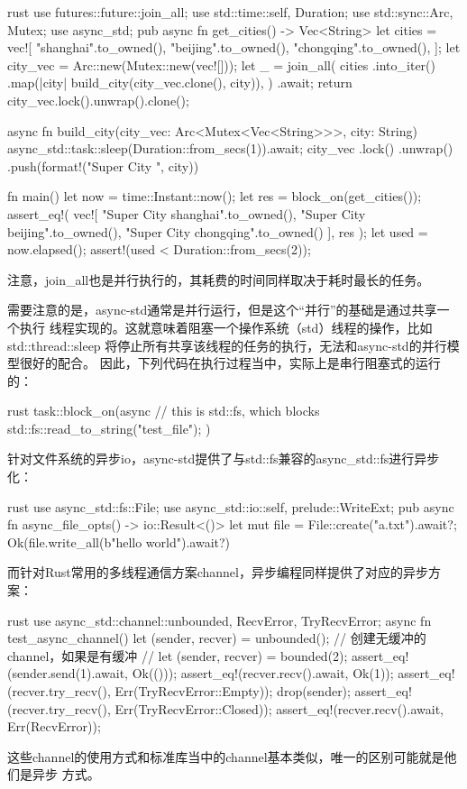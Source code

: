 \begin{code-block}{rust}
use futures::future::join_all;
use std::time::{self, Duration};
use std::sync::{Arc, Mutex};
use async_std;
pub async fn get_cities() -> Vec<String> {
    let cities = vec![
        "shanghai".to_owned(),
        "beijing".to_owned(),
        "chongqing".to_owned(),
    ];
    let city_vec = Arc::new(Mutex::new(vec![]));
    let _ = join_all(
        cities
            .into_iter()
            .map(|city| build_city(city_vec.clone(), city)),
    )
    .await;
    return city_vec.lock().unwrap().clone();
}

async fn build_city(city_vec: Arc<Mutex<Vec<String>>>, city: String) {
    async_std::task::sleep(Duration::from_secs(1)).await;
    city_vec
        .lock()
        .unwrap()
        .push(format!("Super City {}", city))
}

fn main() {
    let now = time::Instant::now();
    let res = block_on(get_cities());
    assert_eq!(
        vec![
            "Super City shanghai".to_owned(),
            "Super City beijing".to_owned(),
            "Super City chongqing".to_owned()
        ],
        res
    );
    let used = now.elapsed();
    assert!(used < Duration::from_secs(2));
}
\end{code-block}
注意，join\_all也是并行执行的，其耗费的时间同样取决于耗时最长的任务。

需要注意的是，async-std通常是并行运行，但是这个“并行”的基础是通过共享一个执行
线程实现的。这就意味着阻塞一个操作系统（std）线程的操作，比如std::thread::sleep
将停止所有共享该线程的任务的执行，无法和async-std的并行模型很好的配合。
因此，下列代码在执行过程当中，实际上是串行阻塞式的运行的：
\begin{code-block}{rust}
task::block_on(async {
    // this is std::fs, which blocks
    std::fs::read_to_string("test_file");
})
\end{code-block}

针对文件系统的异步io，async-std提供了与std::fs兼容的async\_std::fs进行异步化：
\begin{code-block}{rust}
use async_std::fs::File;
use async_std::{io::{self, prelude::WriteExt}};
pub async fn async_file_opts() -> io::Result<()> {
    let mut file = File::create("a.txt").await?;
    Ok(file.write_all(b"hello world").await?)
}
\end{code-block}

而针对Rust常用的多线程通信方案channel，异步编程同样提供了对应的异步方案：
\begin{code-block}{rust}
use async_std::channel::{unbounded, RecvError, TryRecvError};
async fn test_async_channel() {
    let (sender, recver) = unbounded(); // 创建无缓冲的channel，如果是有缓冲
                                        // let (sender, recver) = bounded(2);
    assert_eq!(sender.send(1).await, Ok(()));
    assert_eq!(recver.recv().await, Ok(1));
    assert_eq!(recver.try_recv(), Err(TryRecvError::Empty));
    drop(sender);
    assert_eq!(recver.try_recv(), Err(TryRecvError::Closed));
    assert_eq!(recver.recv().await, Err(RecvError));
}
\end{code-block}
这些channel的使用方式和标准库当中的channel基本类似，唯一的区别可能就是他们是异步
方式。

